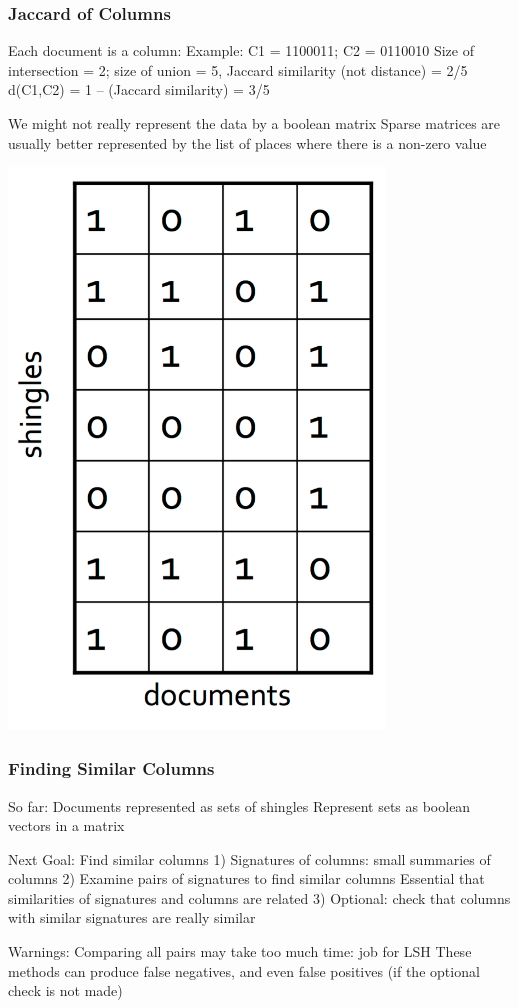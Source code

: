 \documentclass[svgnames]{beamer}
\begin{document}
\begin{frame} \frametitle{Jaccard of Columns}

Each document is a column:
  Example: C1 = 1100011; C2 = 0110010
  Size of intersection = 2; size of union = 5, Jaccard similarity (not distance) = 2/5
  d(C1,C2) = 1 – (Jaccard similarity) = 3/5

We might not really represent the data by a boolean matrix
  Sparse matrices are usually better represented by the list of places where there is a non-zero value
  
\includegraphics[width=10cm]{matrix}

\end{frame}

  
\begin{frame} \frametitle{Finding Similar Columns}
So far:
  Documents represented as sets of shingles
  Represent sets as boolean vectors in a matrix

Next Goal: Find similar columns
 1) Signatures of columns: small summaries of columns
 2) Examine pairs of signatures to find similar columns 
       Essential that similarities of signatures and columns are related
 3) Optional: check that columns with similar signatures are really similar

Warnings:
  Comparing all pairs may take too much time: job for LSH
  These methods can produce false negatives, and even false positives (if the optional check is not made)
  \end{frame}
\end{document}

